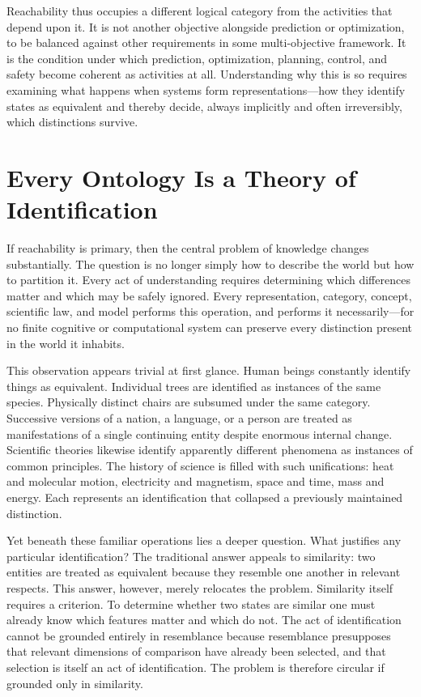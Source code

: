 \documentclass[12pt,a4paper]{article}
\theoremstyle{plain}
\theoremstyle{definition}
\theoremstyle{remark}
\begin{document}
Reachability thus occupies a different logical category from the activities
that depend upon it. It is not another objective alongside prediction or
optimization, to be balanced against other requirements in some
multi-objective framework. It is the condition under which prediction,
optimization, planning, control, and safety become coherent as activities at
all. Understanding why this is so requires examining what happens when
systems form representations---how they identify states as equivalent and
thereby decide, always implicitly and often irreversibly, which distinctions
survive.

\section{Every Ontology Is a Theory of Identification}

If reachability is primary, then the central problem of knowledge changes
substantially. The question is no longer simply how to describe the world but
how to partition it. Every act of understanding requires determining which
differences matter and which may be safely ignored. Every representation,
category, concept, scientific law, and model performs this operation, and
performs it necessarily---for no finite cognitive or computational system can
preserve every distinction present in the world it inhabits.

This observation appears trivial at first glance. Human beings constantly
identify things as equivalent. Individual trees are identified as instances
of the same species. Physically distinct chairs are subsumed under the same
category. Successive versions of a nation, a language, or a person are
treated as manifestations of a single continuing entity despite enormous
internal change. Scientific theories likewise identify apparently different
phenomena as instances of common principles. The history of science is filled
with such unifications: heat and molecular motion, electricity and magnetism,
space and time, mass and energy. Each represents an identification that
collapsed a previously maintained distinction.

Yet beneath these familiar operations lies a deeper question. What justifies
any particular identification? The traditional answer appeals to similarity:
two entities are treated as equivalent because they resemble one another in
relevant respects. This answer, however, merely relocates the problem.
Similarity itself requires a criterion. To determine whether two states are
similar one must already know which features matter and which do not. The act
of identification cannot be grounded entirely in resemblance because
resemblance presupposes that relevant dimensions of comparison have already
been selected, and that selection is itself an act of identification. The
problem is therefore circular if grounded only in similarity.
\end{document}
